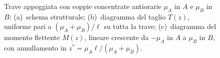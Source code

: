 \begin{figure}[htbp]
{
			}
			\caption{Trave appoggiata con coppie concentrate antiorarie
				$\mu_A$ in $A$ e $\mu_B$ in $B$:
				(a)~schema strutturale;
				(b)~diagramma del taglio $T(z)$, uniforme pari a
				$(\mu_A + \mu_B)/\ell$ su tutta la trave;
				(c)~diagramma del momento flettente $M(z)$, lineare
				crescente da $-\mu_A$ in $A$ a $\mu_B$ in $B$, con
				annullamento in $z^* = \mu_A\ell/(\mu_A+\mu_B)$.}
			\label{fig:stat_trasv_iso_07}
		\end{figure}
